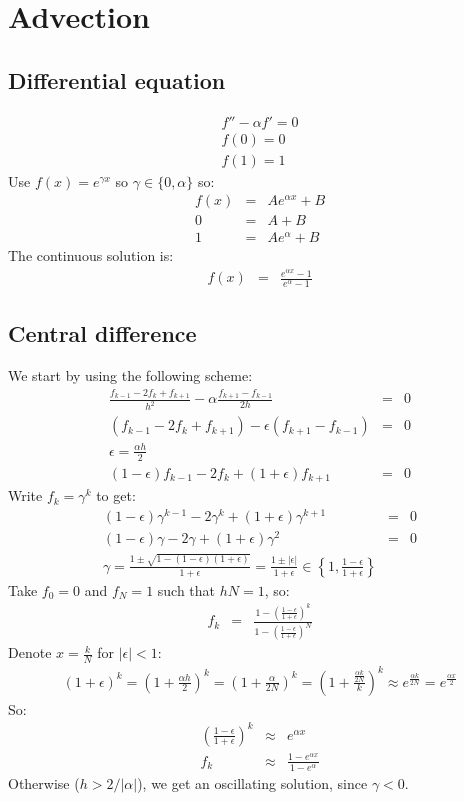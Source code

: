 \documentclass[11pt]{article}
\newcommand\eps \epsilon
\begin{document}
\section{Advection}
\subsection{Differential equation}
\begin{eqnarray}
  f'' - \alpha f' = 0 \\
  f(0) = 0 \\ f(1) = 1
\end{eqnarray}
Use $f(x) = e^{\gamma x}$ so $\gamma \in \{0, \alpha\}$ so:
\begin{eqnarray}
  f(x) &=& Ae^{\alpha x} + B \\
  0 &=& A + B \\
  1 &=& Ae^{\alpha} + B
\end{eqnarray}
The continuous solution is:
\begin{eqnarray}
  f(x) &=& \frac{e^{\alpha x} - 1}{e^{\alpha} - 1}
\end{eqnarray}
\subsection{Central difference}
We start by using the following scheme:
\begin{eqnarray}
  \frac{f_{k-1}-2f_k+f_{k+1}}{h^2}
  - \alpha \frac{f_{k+1}-f_{k-1}}{2h} &=& 0 \\
(f_{k-1}-2f_k+f_{k+1}) - \eps (f_{k+1}-f_{k-1}) &=& 0 \\
\eps = \frac{\alpha h}{2} \\
(1-\eps)f_{k-1}-2f_k+(1+\eps)f_{k+1} &=& 0
\end{eqnarray}
Write $f_k = \gamma^k$ to get:
\begin{eqnarray}
  (1-\eps)\gamma^{k-1} - 2\gamma^k + (1+\eps)\gamma^{k+1}&=& 0 \\
  (1-\eps)\gamma - 2\gamma + (1+\eps)\gamma^2&=& 0 \\
  \gamma = \frac{1 \pm \sqrt{1 - (1-\eps)(1+\eps)}}{1+\eps}
         = \frac{1 \pm |\eps|}{1+\eps} \in
           \left\{1, \frac{1- \eps}{1+\eps}\right\}
\end{eqnarray}
Take $f_0 = 0$ and $f_N = 1$ such that $h N = 1$, so:
\begin{eqnarray}
  f_k &=& \frac{1 - \left(\frac{1- \eps}{1+\eps}\right)^k}
  {1 - \left(\frac{1- \eps}{1+\eps}\right)^N}
\end{eqnarray}
Denote $x = \frac{k}{N}$ for $|\eps| < 1$:
\begin{eqnarray}
(1+\eps)^k = \left(1+\frac{\alpha h}{2}\right)^k =
\left(1+\frac{\alpha}{2N}\right)^k =
\left(1+\frac{\frac{\alpha k}{2N}}{k}\right)^k \approx
e^{\frac{\alpha k}{2N}} = e^{\frac{\alpha x}{2}}
\end{eqnarray}
So:
\begin{eqnarray}
  \left(\frac{1- \eps}{1+\eps}\right)^k &\approx& e^{\alpha x} \\
  f_k &\approx& \frac{1 - e^{\alpha x}}{1 - e^{\alpha}}
\end{eqnarray}
Otherwise ($h > 2/|\alpha|$), we get an oscillating solution, since $\gamma < 0$.
\end{document}
